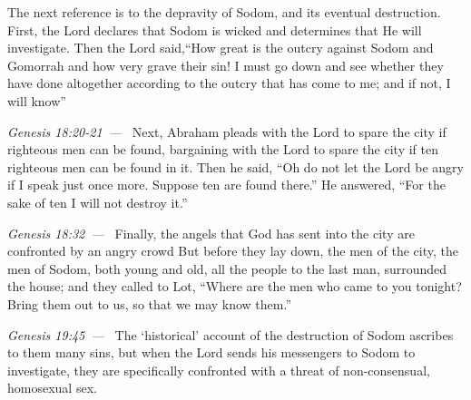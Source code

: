 \documentclass[10pt]{article}
\let\oldquote\quote
\let\endoldquote\endquote
\renewenvironment{quote}[2][]
  {\if\relax\detokenize{#1}\relax
     \def\quoteauthor{#2}%
   \else
     \def\quoteauthor{#2~---~#1}%
   \fi
   \oldquote}
  {\par\nobreak\smallskip\hfill\textit{\quoteauthor}%
   \endoldquote\addvspace{\bigskipamount}}
\begin{document}
The next reference is to the depravity of Sodom, and its eventual destruction. First, the Lord declares that Sodom is wicked and determines that He will investigate.
\begin{quote}{Genesis 18:20-21}
Then the Lord said,``How great is the outcry against Sodom and Gomorrah and how very grave their sin! I must go down and see whether they have done altogether according to the outcry that has come to me; and if not, I will know''
\end{quote}
Next, Abraham pleads with the Lord to spare the city if righteous men can be found, bargaining with the Lord to spare the city if ten righteous men can be found in it.
\begin{quote}{Genesis 18:32}
Then he said, ``Oh do not let the Lord be angry if I speak just once more. Suppose ten are found there.” He answered, “For the sake of ten I will not destroy it.''
\end{quote}
Finally, the angels that God has sent into the city are confronted by an angry crowd
\begin{quote}{Genesis 19:45}
But before they lay down, the men of the city, the men of Sodom, both young and old, all the people to the last man, surrounded the house; and they called to Lot, ``Where are the men who came to you tonight? Bring them out to us, so that we may know them.''
\end{quote}
The `historical' account of the destruction of Sodom ascribes to them many sins, but when the Lord sends his messengers to Sodom to investigate, they are specifically confronted with a threat of non-consensual, homosexual sex. 
\end{document}
